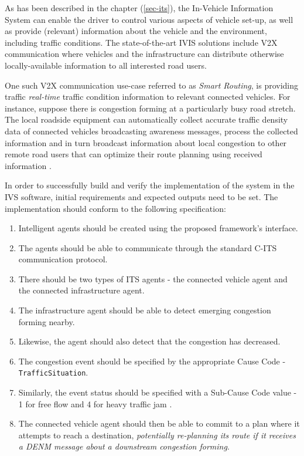\documentclass[main.tex]{subfiles}
\begin{document}
As has been described in the chapter (\ref{sec-its}), the In-Vehicle Information System can enable 
the driver to control various aspects of vehicle set-up, as well as provide (relevant) information about 
the vehicle and the environment, including traffic conditions. The state-of-the-art IVIS solutions include 
V2X communication where vehicles and the infrastructure can distribute otherwise locally-available 
information to all interested road users. 

One such V2X communication use-case referred to as \emph{Smart Routing}, is providing traffic
\emph{real-time} traffic condition information to relevant connected vehicles. For instance,
suppose there is congestion forming at a particularly busy road stretch. The local roadside
equipment can automatically collect accurate traffic density data of connected vehicles
broadcasting awareness messages, process the collected information and in turn broadcast
information about local congestion to other remote road users that can optimize their route
planning using received information \cite{Kotsi2020}.


In order to successfully build and verify the implementation of the system in the IVS software, 
initial requirements and expected outputs need to be set. The implementation should conform to 
the following specification:

\begin{enumerate}
    \item Intelligent agents should be created using the proposed framework's interface.
    \item The agents should be able to communicate through the standard C-ITS communication protocol.
    \item There should be two types of ITS agents - the connected vehicle agent and the connected infrastructure agent.
    \item The infrastructure agent should be able to detect emerging congestion forming nearby.
    \item Likewise, the agent should also detect that the congestion has decreased.
    \item The congestion event should be specified by the appropriate Cause Code - \texttt{TrafficSituation}.
    \item Similarly, the event status should be specified with a Sub-Cause Code value - 1 for
    free flow and 4 for heavy traffic jam \cite{ETSI2019}. 
    \item The connected vehicle agent should then be able to commit to a plan where it attempts to reach a
    destination, \emph{potentially re-planning its route if it receives a DENM message about a downstream congestion forming}.
 \end{enumerate}
\end{document}
